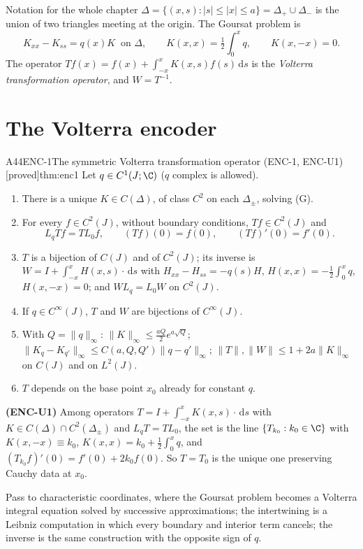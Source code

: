 \documentclass[11pt,a4paper,oneside]{report}
\newcommand{\badge}[2]{\textcolor{#1}{\textsf{\footnotesize[#2]}}}
\newcommand{\proved}{\badge{cC}{proved}}
\newcommand{\dd}{\,\mathrm{d}}
\newenvironment{dimcard}[5]{\par\Needspace{12\baselineskip}\begin{dimcardbox}{#1}{#2}{#3}{#4}{#5}}{\end{dimcardbox}}
\begin{document}
\begin{notebox}{Notation for the whole chapter}
$\Delta=\{(x,s):|s|\le|x|\le a\}=\Delta_+\cup\Delta_-$ is the union of two triangles meeting at the origin. The Goursat problem is
\[
K_{xx}-K_{ss}=q(x)K\ \text{ on }\Delta,\qquad K(x,x)=\tfrac12\int_0^xq,\qquad K(x,-x)=0 .\tag{G}
\]
The operator $Tf(x)=f(x)+\int_{-x}^{x}K(x,s)f(s)\dd s$ is the \emph{Volterra transformation operator}, and $W=T^{-1}$.
\end{notebox}

\section{The Volterra encoder}

\begin{dimcard}{A44}{ENC-1}{The symmetric Volterra transformation operator (ENC-1, ENC-U1)}{\proved}{thm:enc1}
Let $q\in C^1(J;\C)$ ($q$ complex is allowed).
\begin{enumerate}[label=(\arabic*)]
\item There is a unique $K\in C(\Delta)$, of class $C^2$ on each $\Delta_\pm$, solving (G).
\item For every $f\in C^2(J)$, without boundary conditions, $Tf\in C^2(J)$ and
\[
L_qTf=TL_0f,\qquad (Tf)(0)=f(0),\qquad (Tf)'(0)=f'(0).
\]
\item $T$ is a bijection of $C(J)$ and of $C^2(J)$; its inverse is $W=I+\int_{-x}^xH(x,s)\cdot\dd s$ with $H_{xx}-H_{ss}=-q(s)H$, $H(x,x)=-\tfrac12\int_0^xq$, $H(x,-x)=0$; and $WL_q=L_0W$ on $C^2(J)$.
\item If $q\in C^\infty(J)$, $T$ and $W$ are bijections of $C^\infty(J)$.
\item With $Q=\|q\|_\infty$: $\|K\|_\infty\le\frac{aQ}2e^{a\sqrt Q}$; $\|K_q-K_{q'}\|_\infty\le C(a,Q,Q')\|q-q'\|_\infty$; $\|T\|,\|W\|\le1+2a\|K\|_\infty$ on $C(J)$ and on $L^2(J)$.
\item $T$ depends on the base point $x_0$ already for constant $q$.
\end{enumerate}
\textbf{(ENC-U1)} Among operators $T=I+\int_{-x}^xK(x,s)\cdot\dd s$ with $K\in C(\Delta)\cap C^2(\Delta_\pm)$ and $L_qT=TL_0$, the set is the line $\{T_{k_0}:k_0\in\C\}$ with $K(x,-x)\equiv k_0$, $K(x,x)=k_0+\frac12\int_0^xq$, and $(T_{k_0}f)'(0)=f'(0)+2k_0f(0)$. So $T=T_0$ is the unique one preserving Cauchy data at $x_0$.
\end{dimcard}

\begin{proofidea}
Pass to characteristic coordinates, where the Goursat problem becomes a Volterra integral equation solved by successive approximations; the intertwining is a Leibniz computation in which every boundary and interior term cancels; the inverse is the same construction with the opposite sign of $q$.
\end{proofidea}
\end{document}
